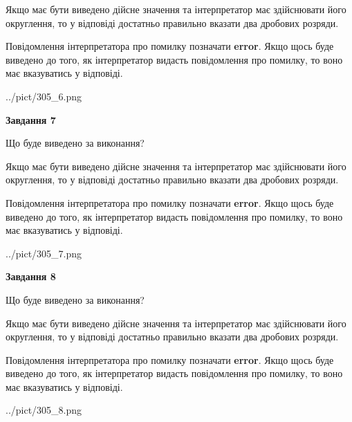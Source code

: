 \documentclass[12pt, ukrainian]{article}
\begin{document}
{\begin {Large}
Якщо має бути виведено дійсне значення та інтерпретатор має здійснювати його округлення, 
то у відповіді достатньо правильно вказати два дробових розряди.

Повідомлення інтерпретатора про помилку позначати \textbf{error}.
Якщо щось буде виведено до того, як інтерпретатор видасть повідомлення про помилку, 
то воно має вказуватись у відповіді. \par

\begin{center}
	{../pict/305_6.png}
\end{center}
\newpage

{\begin {center}\textbf{Завдання 7}\end {center}}\par
Що буде виведено за виконання? \par

Якщо має бути виведено дійсне значення та інтерпретатор має здійснювати його округлення, 
то у відповіді достатньо правильно вказати два дробових розряди.

Повідомлення інтерпретатора про помилку позначати \textbf{error}.
Якщо щось буде виведено до того, як інтерпретатор видасть повідомлення про помилку, 
то воно має вказуватись у відповіді. \par

\begin{center}
	{../pict/305_7.png}
\end{center}
\newpage

{\begin {center}\textbf{Завдання 8}\end {center}}\par
Що буде виведено за виконання? \par

Якщо має бути виведено дійсне значення та інтерпретатор має здійснювати його округлення, 
то у відповіді достатньо правильно вказати два дробових розряди.

Повідомлення інтерпретатора про помилку позначати \textbf{error}.
Якщо щось буде виведено до того, як інтерпретатор видасть повідомлення про помилку, 
то воно має вказуватись у відповіді. \par

\begin{center}
	{../pict/305_8.png}
\end{center}
\newpage


\end{Large}}
\end{document}
